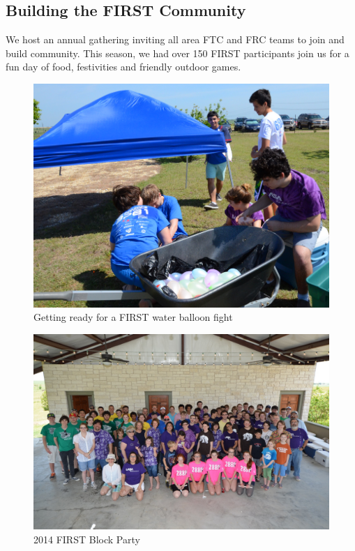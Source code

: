 \subsection{Building the FIRST Community}
We host an annual gathering inviting all area FTC and FRC teams to join and build community.  This season, we had over 150 FIRST participants join us for a fun day of food, festivities and friendly outdoor games.
\begin{figure}[H]
	\centering
	\includegraphics[height=0.8\linewidth]{community}
	\caption[]{Getting ready for a FIRST water balloon fight}
	\label{fig:community}
\end{figure}
\begin{figure}[H]
	\centering
	\includegraphics[height=\linewidth]{community1}
	\caption[]{2014 FIRST Block Party }
	\label{fig:community1}
\end{figure}

